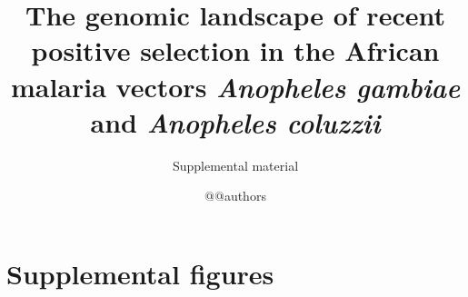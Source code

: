 \documentclass[a4paper,11pt,abstracton,hidelinks]{scrartcl}
\title{
The genomic landscape of recent positive selection in the African malaria vectors \textit{Anopheles gambiae} and \textit{Anopheles coluzzii}
}
\subtitle{\large{Supplemental material}}
\author{@@authors}
\begin{document}
\maketitle

\beginsupplement

\tableofcontents
\listoffigures
\listoftables

\clearpage


\section{Supplemental figures}


%
%
%
%
%
\end{document}

